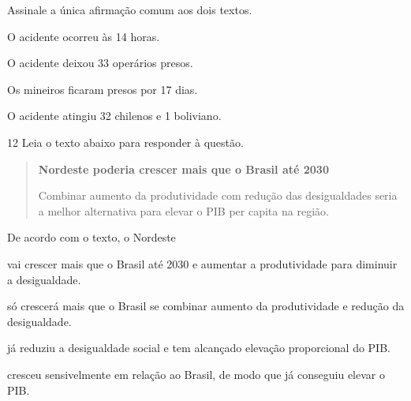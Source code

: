 

\renewcommand{\fonte}[1]{}

Assinale a única afirmação comum aos dois textos. 

\begin{escolha}

    \item O acidente ocorreu às 14 horas.

    \item O acidente deixou 33 operários presos.

    \item Os mineiros ficaram presos por 17 dias.

    \item O acidente atingiu 32 chilenos e 1 boliviano.

\end{escolha}

\num{12} Leia o texto abaixo para responder à questão. 

\begin{quote}

\textbf{Nordeste poderia crescer mais que o Brasil até 2030}

Combinar aumento da produtividade com redução das desigualdades seria a
melhor alternativa para elevar o PIB per capita na região.

\fonte{Instituto de Pesquisa Econômica Aplicada. Nordeste poderia crescer mais
 que o Brasil até 2030. Disponível em:
 https://www.ipea.gov.br/portal/categorias/45-todas-as-noticias/noticia 9506-nordeste-poderia-crescer-mais-que-o-brasil-ate-2030?highlight=WyJub3JkZXN0ZSIsIm5vcmRlc3RlJy4iXQ==.
 Acesso em: 24 mai. 2023.}

\end{quote}

De acordo com o texto, o Nordeste

\begin{escolha}
    
    \item vai crescer mais que o Brasil até 2030 e aumentar a produtividade para diminuir a desigualdade.
    
    \item só crescerá mais que o Brasil se combinar aumento da produtividade e redução da desigualdade. 
    
    \item já reduziu a desigualdade social e tem alcançado elevação proporcional do PIB.
    
    \item cresceu sensivelmente em relação ao Brasil, de modo que já conseguiu elevar o PIB.

\end{escolha}

